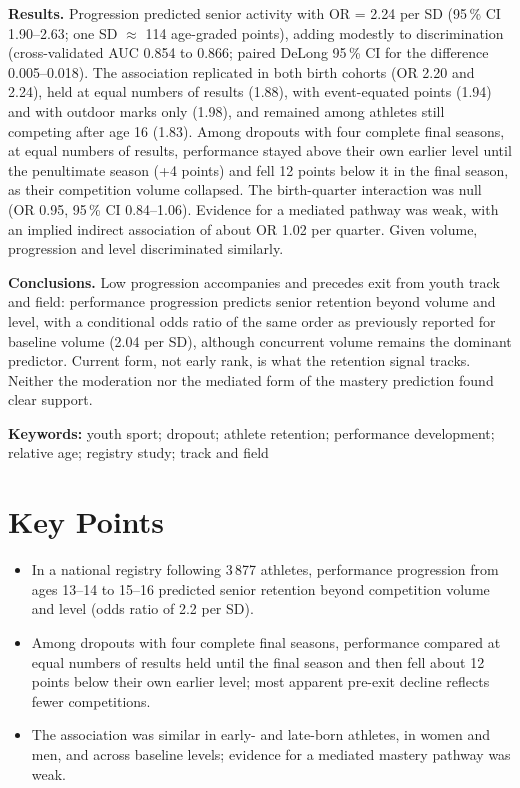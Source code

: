\documentclass[12pt,a4paper]{article}
\begin{document}
\noindent\textbf{Results.} Progression predicted senior activity with OR = 2.24 per SD (95\,\% CI 1.90--2.63; one SD $\approx$ 114 age-graded points), adding modestly to discrimination (cross-validated AUC 0.854 to 0.866; paired DeLong 95\,\% CI for the difference 0.005--0.018). The association replicated in both birth cohorts (OR 2.20 and 2.24), held at equal numbers of results (1.88), with event-equated points (1.94) and with outdoor marks only (1.98), and remained among athletes still competing after age 16 (1.83). Among dropouts with four complete final seasons, at equal numbers of results, performance stayed above their own earlier level until the penultimate season (+4 points) and fell 12 points below it in the final season, as their competition volume collapsed. The birth-quarter interaction was null (OR 0.95, 95\,\% CI 0.84--1.06). Evidence for a mediated pathway was weak, with an implied indirect association of about OR 1.02 per quarter. Given volume, progression and level discriminated similarly.

\noindent\textbf{Conclusions.} Low progression accompanies and precedes exit from youth track and field: performance progression predicts senior retention beyond volume and level, with a conditional odds ratio of the same order as previously reported for baseline volume (2.04 per SD), although concurrent volume remains the dominant predictor. Current form, not early rank, is what the retention signal tracks. Neither the moderation nor the mediated form of the mastery prediction found clear support.

\vspace{0.5em}
\noindent\textbf{Keywords:} youth sport; dropout; athlete retention; performance development; relative age; registry study; track and field


\section*{Key Points}
\begin{itemize}[leftmargin=1.2em]
  \item In a national registry following 3\,877 athletes, performance progression from ages 13--14 to 15--16 predicted senior retention beyond competition volume and level (odds ratio of 2.2 per SD).
  \item Among dropouts with four complete final seasons, performance compared at equal numbers of results held until the final season and then fell about 12 points below their own earlier level; most apparent pre-exit decline reflects fewer competitions.
  \item The association was similar in early- and late-born athletes, in women and men, and across baseline levels; evidence for a mediated mastery pathway was weak.
\end{itemize}
\end{document}
